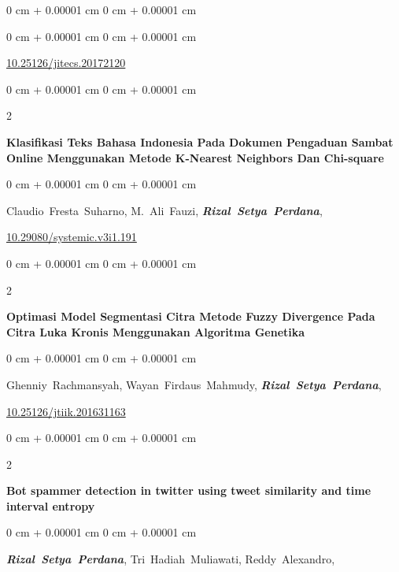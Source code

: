 \documentclass[10pt, letterpaper]{article}
\newenvironment{onecolentry}{
    \begin{adjustwidth}{
        0 cm + 0.00001 cm
    }{
        0 cm + 0.00001 cm
    }
}{
    \end{adjustwidth}
} %
\newenvironment{twocolentry}[2][]{
    \onecolentry
    \def\secondColumn{#2}
    \setcolumnwidth{\fill, 4.5 cm}
    \begin{paracol}{2}
}{
    \switchcolumn \raggedleft \secondColumn
    \end{paracol}
    \endonecolentry
} %
\begin{document}
\begin{onecolentry}
\begin{samepage}
\begin{onecolentry}
                \vspace{0.10 cm}
                \href{https://doi.org/10.25126/jitecs.20172120}{10.25126/jitecs.20172120}
            \end{onecolentry}
        \end{samepage}
        \vspace{0.3 cm}
        \begin{samepage}
            \begin{twocolentry}{2017}
                \textbf{Klasifikasi Teks Bahasa Indonesia Pada Dokumen Pengaduan Sambat Online Menggunakan Metode K-Nearest Neighbors Dan Chi-square}
            \end{twocolentry}
            \vspace{0.10 cm}
            \begin{onecolentry}
                \mbox{Claudio Fresta Suharno},
                \mbox{M. Ali Fauzi},
                \mbox{\textbf{\textit{Rizal Setya Perdana}}}, 
                 
                \vspace{0.10 cm}
                \href{https://doi.org/10.29080/systemic.v3i1.191}{10.29080/systemic.v3i1.191}
            \end{onecolentry}
        \end{samepage}
        \vspace{0.3 cm}
        \begin{samepage}
            \begin{twocolentry}{2016}
                \textbf{Optimasi Model Segmentasi Citra Metode Fuzzy Divergence Pada Citra Luka Kronis Menggunakan Algoritma Genetika}
            \end{twocolentry}
            \vspace{0.10 cm}
            \begin{onecolentry}
                \mbox{Ghenniy Rachmansyah},
                \mbox{Wayan Firdaus Mahmudy},
                \mbox{\textbf{\textit{Rizal Setya Perdana}}}, 
                 
                \vspace{0.10 cm}
                \href{https://doi.org/10.25126/jtiik.201631163}{10.25126/jtiik.201631163}
            \end{onecolentry}
        \end{samepage}
        \vspace{0.3 cm}
        \begin{samepage}
            \begin{twocolentry}{2015}
                \textbf{Bot spammer detection in twitter using tweet similarity and time interval entropy}
            \end{twocolentry}
            \vspace{0.10 cm}
            \begin{onecolentry}
                 \mbox{\textbf{\textit{Rizal Setya Perdana}}},
                 \mbox{Tri Hadiah Muliawati},
                 \mbox{Reddy Alexandro},
                \vspace{0.10 cm}
                

\end{onecolentry}
\end{samepage}
\end{onecolentry}
\end{document}
